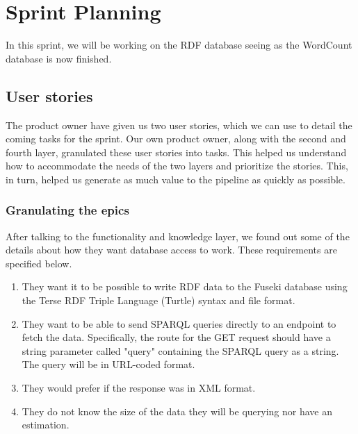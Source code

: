 \section{Sprint Planning}\label{section:sprintPlanningSprint5}
In this sprint, we will be working on the RDF database seeing as the WordCount database is now finished.

\subsection*{User stories}\label{sec:userstories5}
The \knox{} product owner have given us two user stories, which we can use to detail the coming tasks for the sprint.
Our own product owner, along with the second and fourth layer, granulated these user stories into tasks.
This helped us understand how to accommodate the needs of the two layers and prioritize the stories.
This, in turn, helped us generate as much value to the pipeline as quickly as possible\cite{UserStories}.


\subsubsection*{Granulating the epics}
After talking to the functionality and knowledge layer, we found out some of the details about how they want database access to work. These requirements are specified below.



\begin{enumerate}
    \item They want it to be possible to write RDF data to the Fuseki database using the Terse RDF Triple Language (Turtle) syntax and file format\cite{TurtleFormat}.
    \item They want to be able to send SPARQL queries directly to an endpoint to fetch the data. Specifically, the route for the GET request should have a string parameter called "query" containing the SPARQL query as a string. The query will be in URL-coded format.
    \item They would prefer if the response was in XML format.
    \item They do not know the size of the data they will be querying nor have an estimation.
\end{enumerate}

